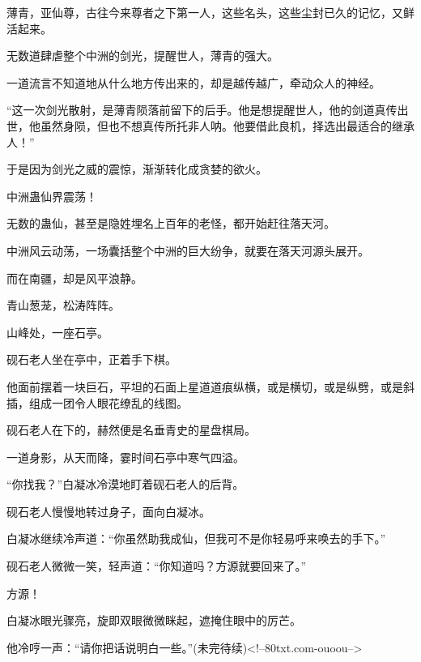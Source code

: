\begin{this_body}
薄青，亚仙尊，古往今来尊者之下第一人，这些名头，这些尘封已久的记忆，又鲜活起来。

无数道肆虐整个中洲的剑光，提醒世人，薄青的强大。

一道流言不知道地从什么地方传出来的，却是越传越广，牵动众人的神经。

“这一次剑光散射，是薄青陨落前留下的后手。他是想提醒世人，他的剑道真传出世，他虽然身陨，但也不想真传所托非人呐。他要借此良机，择选出最适合的继承人！”

于是因为剑光之威的震惊，渐渐转化成贪婪的欲火。

中洲蛊仙界震荡！

无数的蛊仙，甚至是隐姓埋名上百年的老怪，都开始赶往落天河。

中洲风云动荡，一场囊括整个中洲的巨大纷争，就要在落天河源头展开。

而在南疆，却是风平浪静。

青山葱茏，松涛阵阵。

山峰处，一座石亭。

砚石老人坐在亭中，正着手下棋。

他面前摆着一块巨石，平坦的石面上星道道痕纵横，或是横切，或是纵劈，或是斜插，组成一团令人眼花缭乱的线图。

砚石老人在下的，赫然便是名垂青史的星盘棋局。

一道身影，从天而降，霎时间石亭中寒气四溢。

“你找我？”白凝冰冷漠地盯着砚石老人的后背。

砚石老人慢慢地转过身子，面向白凝冰。

白凝冰继续冷声道：“你虽然助我成仙，但我可不是你轻易呼来唤去的手下。”

砚石老人微微一笑，轻声道：“你知道吗？方源就要回来了。”

方源！

白凝冰眼光骤亮，旋即双眼微微眯起，遮掩住眼中的厉芒。

他冷哼一声：“请你把话说明白一些。”(未完待续)<!--80txt.com-ouoou-->

\end{this_body}

